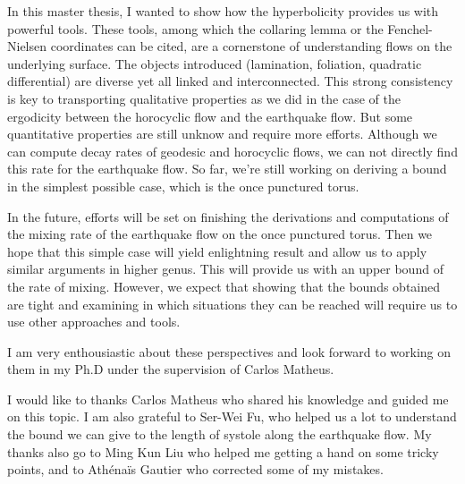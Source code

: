 In this master thesis, I wanted to show how the hyperbolicity provides us with powerful tools. These tools, among which the collaring lemma or the Fenchel-Nielsen coordinates can be cited, are a cornerstone of understanding flows on the underlying surface. The objects introduced (lamination, foliation, quadratic differential) are diverse yet all linked and interconnected. This strong consistency is key to transporting qualitative properties as we did in the case of the ergodicity between the horocyclic flow and the earthquake flow. But some quantitative properties are still unknow and require more efforts. Although we can compute decay rates of geodesic and horocyclic flows, we can not directly find this rate for the earthquake flow. So far, we're still working on deriving a bound in the simplest possible case, which is the once punctured torus.


In the future, efforts will be set on finishing the derivations and computations of the mixing rate of the earthquake flow on the once punctured torus. Then we hope that this simple case will yield enlightning result and allow us to apply similar arguments in higher genus. This will provide us with an upper bound of the rate of mixing. However, we expect that showing that the bounds obtained are tight and examining in which situations they can be reached will require us to use other approaches and tools.

I am very enthousiastic about these perspectives and look forward to working on them in my Ph.D under the supervision of Carlos Matheus.

I would like to thanks Carlos Matheus who shared his knowledge and guided me on this topic. I am also grateful to Ser-Wei Fu, who helped us a lot to understand the bound we can give to the length of systole along the earthquake flow. My thanks also go to Ming Kun Liu who helped me getting a hand on some tricky points, and to Athénaïs Gautier who corrected some of my mistakes.


